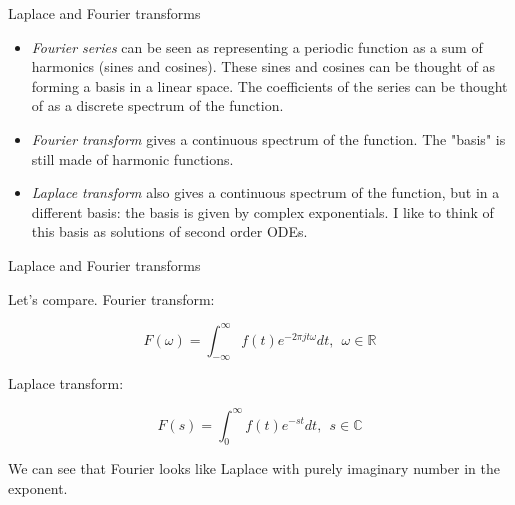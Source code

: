 \documentclass{beamer}
\begin{document}
\myqrframe




\begin{frame}{Laplace and Fourier transforms}
	\begin{flushleft}
		
		\begin{itemize}
			\item \emph{Fourier series} can be seen as representing a periodic function as a sum of harmonics (sines and cosines). These sines and cosines can be thought of as forming a basis in a linear space. The coefficients of the series can be thought of as a discrete spectrum of the function.
			
			\item \emph{Fourier transform} gives a continuous spectrum of the function. The "basis" is still made of harmonic functions.
			
			\item \emph{Laplace transform} also gives a continuous spectrum of the function, but in a different basis: the basis is given by complex exponentials. I like to think of this basis as solutions of second order ODEs.
		\end{itemize}
		
	\end{flushleft}
\end{frame}



\begin{frame}{Laplace and Fourier transforms}
	\begin{flushleft}
		
		Let's compare. Fourier transform:
		
		\begin{equation}
			F(\omega) = \int_{-\infty}^\infty f(t) e^{-2\pi j t \omega} dt, \ \ \omega \in \mathbb{R}
		\end{equation}
		
		Laplace transform:
		
		\begin{equation}
			F(s) = \int_0^\infty f(t) e^{-st}dt, \ \ s \in \mathbb{C}
		\end{equation}
		
		We can see that Fourier looks like Laplace with purely imaginary number in the exponent.
		
	\end{flushleft}
\end{frame}
\end{document}

